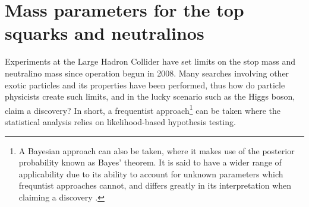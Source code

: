 
\section{Mass parameters for the top squarks and neutralinos}
Experiments at the Large Hadron Collider have set limits on the stop mass and neutralino mass since operation begun in 2008. Many searches involving other exotic particles and its properties have been performed, thus how do particle physicists create such limits, and in the lucky scenario such as the Higgs boson, claim a discovery? In short, a frequentist approach\footnote{A Bayesian approach can also be taken, where it makes use of the posterior probability known as Bayes' theorem. It is said to have a wider range of applicability due to its ability to account for unknown parameters which frequntist approaches cannot, and differs greatly in its interpretation when claiming a discovery \cite{lista2017statistical}.} can be taken where the statistical analysis relies on likelihood-based hypothesis testing.

